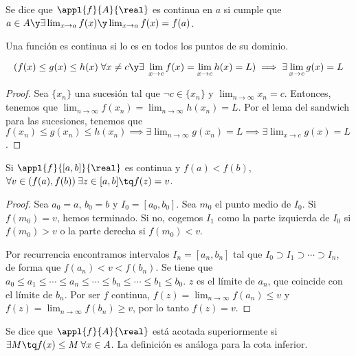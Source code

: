 \documentclass[nochap]{apuntes}
\begin{document}
\begin{defn} Se dice que $\appl{f}{A}{\real}$ es continua en $a$ si cumple que $a\in A \y \exists \lim_{x\to a} f(x) \y \lim_{x\to a} f(x) = f(a)$.\end{defn}

\begin{defn} Una función es continua si lo es en todos los puntos de su dominio.\end{defn}

\begin{theorem}
\[(f(x) \leq g(x) \leq h(x) \; \forall x \neq c \y \exists \; \lim_{x\to c}f(x) =\lim_{x\to c}h(x)=L) \implies \exists \lim_{x\to c}g(x) = L\]
\end{theorem}

\begin{proof}
Sea $\{x_n\}$ una sucesión tal que $\neg c \in \{x_n\}$ y $\lim_{n\to\infty}x_n = c$. Entonces, tenemos que $\lim_{n\to\infty}f(x_n)=\lim_{n\to\infty}h(x_n)=L$. Por el lema del sandwich para las sucesiones, tenemos que $f(x_n)\leq g(x_n) \leq h(x_n) \implies \exists \lim_{n\to\infty}g(x_n)=L \implies \exists \lim_{x\to c}g(x) = L$.
\end{proof}

\begin{theorem}
Si $\appl{f}{[a,b]}{\real}$ es continua y $f(a)<f(b)$, $\forall v \in (f(a),f(b)) \:\exists z \in [a,b] \tq f(z)=v$.
\end{theorem}

\begin{proof}
Sea $a_0=a$, $b_0=b$ y $I_0=[a_0, b_0]$. Sea $m_0$ el punto medio de $I_0$. Si $f(m_0)=v$, hemos terminado. Si no, cogemos $I_1$ como la parte izquierda de $I_0$ si $f(m_0) >v$ o la parte derecha si $f(m_0)<v$.

Por recurrencia encontramos intervalos $I_n=[a_n, b_n]$ tal que $I_0\supset I_1 \supset \cdots \supset I_n$, de forma que $f(a_n)<v<f(b_n)$. Se tiene que $a_0 \leq a_1 \leq \cdots \leq a_n \leq \cdots \leq b_n \leq \cdots \leq b_1 \leq b_0$. $z$ es el límite de $a_n$, que coincide con el límite de $b_n$. Por ser $f$ continua, $f(z)=\lim_{n\to\infty}f(a_n) \leq v$ y $f(z)=\lim_{n\to\infty}f(b_n) \geq v$, por lo tanto $f(z)=v$.
\end{proof}

\begin{defn}
Se dice que $\appl{f}{A}{\real}$ está acotada superiormente si $\exists M \tq f(x)\leq M \: \forall x\in A$. La definición es análoga para la cota inferior.
\end{defn}
\end{document}
